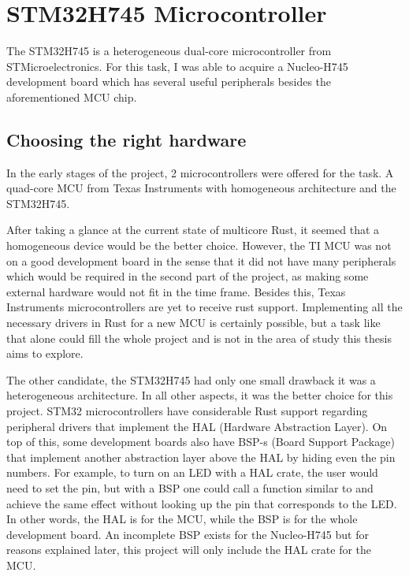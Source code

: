 \chapter{STM32H745 Microcontroller}

The STM32H745 is a heterogeneous dual-core microcontroller from STMicroelectronics. For this task, I was able to acquire a Nucleo-H745 development board which has several useful peripherals besides the aforementioned MCU chip.

\section{Choosing the right hardware}

In the early stages of the project, 2 microcontrollers were offered for the task. A quad-core MCU from Texas Instruments with homogeneous architecture and the STM32H745.

After taking a glance at the current state of multicore Rust, it seemed that a homogeneous device would be the better choice. However, the TI MCU was not on a good development board in the sense that it did not have many peripherals which would be required in the second part of the project, as making some external hardware would not fit in the time frame. Besides this, Texas Instruments microcontrollers are yet to receive rust support. Implementing all the necessary drivers in Rust for a new MCU is certainly possible, but a task like that alone could fill the whole project and is not in the area of study this thesis aims to explore.

The other candidate, the STM32H745 had only one small drawback it was a heterogeneous architecture. In all other aspects, it was the better choice for this project. STM32 microcontrollers have considerable Rust support regarding peripheral drivers that implement the HAL (Hardware Abstraction Layer). On top of this, some development boards also have BSP-s (Board Support Package) that implement another abstraction layer above the HAL by hiding even the pin numbers. For example, to turn on an LED with a HAL crate, the user would need to set the  pin, but with a BSP one could call a function similar to  and achieve the same effect without looking up the pin that corresponds to the LED. In other words, the HAL is for the MCU, while the BSP is for the whole development board. An incomplete BSP exists for the Nucleo-H745 but for reasons explained later, this project will only include the HAL crate for the MCU.

